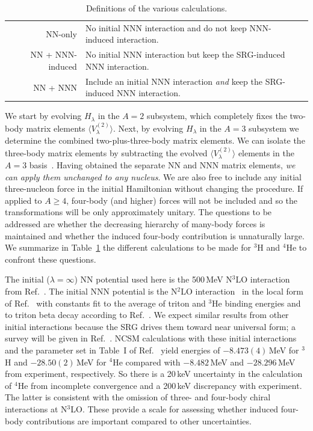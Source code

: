 \documentclass[prc,twocolumn,showpacs,floatfix,nofootinbib,superscriptaddress]{revtex4}
\newcommand{\la}{\langle}
\newcommand{\ra}{\rangle}
\begin{document}
\begin{table}[tbh-]
\caption{\label{tab:one}Definitions of the various calculations.}
\begin{ruledtabular}
\begin{tabular}{crlc}
 & NN-only & No initial NNN interaction and do not keep
              NNN-induced interaction. &  \\
 & NN + NNN-induced & No initial NNN interaction but keep the
         SRG-induced NNN interaction. &  \\
 & NN + NNN & Include an initial NNN interaction \emph{and} keep
         the SRG-induced NNN interaction. &  \\
\end{tabular}
\end{ruledtabular}
\end{table}

We start by evolving $H_\lambda$ in the $A=2$ subsystem, which completely
fixes the two-body matrix elements $\la V_\lambda^{(2)}\ra$.
Next, by evolving $H_\lambda$ in the $A=3$ subsystem we determine the
combined two-plus-three-body matrix elements.
We can isolate the three-body matrix elements
by subtracting the evolved  $\la V_\lambda^{(2)}\ra$ elements
in the $A=3$ basis~\cite{Jurgenson:2008jp}. Having obtained
the separate NN and NNN matrix elements, 
\emph{we can apply them unchanged to any nucleus}. 
We are also free to include any initial
three-nucleon force in the initial Hamiltonian without
changing the procedure. 
If applied to $A \geq 4$, four-body (and higher) forces will not
be included and
so the transformations will be only approximately unitary. 
The questions to be addressed
are whether the decreasing hierarchy of many-body forces is
maintained and whether the induced four-body contribution
is unnaturally large.  
We summarize in
Table~\ref{tab:one} the different calculations to be made for 
$^3$H and $^4$He to confront these questions.

The initial ($\lambda = \infty$) NN potential used here
is the 500\,MeV N$^3$LO interaction from Ref.~\cite{N3LO}.  The
initial NNN potential is the N$^2$LO
interaction~\cite{Epelbaum:2002vt} 
in the local form of Ref.~\cite{Navratil:07} 
with constants fit to the average of triton and $^3$He binding 
energies and to triton beta decay  according to
Ref.~\cite{Gazit:2008ma}.
We expect similar results from
other initial interactions because the SRG drives them toward
near universal form; a survey will be given in
Ref.~\cite{Jurgenson:2009}. NCSM calculations with these initial
interactions and the parameter set in Table~I of
Ref.~\cite{Gazit:2008ma} yield energies of
$-8.473(4)\,$MeV for $^3$H and $-28.50(2)\,$MeV for $^4$He
compared  with $-8.482\,$MeV and $-28.296\,$MeV from experiment,
respectively. So there is a 20\,keV uncertainty in the
calculation of $^4$He from incomplete convergence and a
200\,keV discrepancy with experiment. 
The latter is consistent with the omission of three- and four-body
chiral interactions at N$^3$LO.
These provide a scale for
assessing whether induced four-body contributions are important
compared to other uncertainties.
\end{document}
